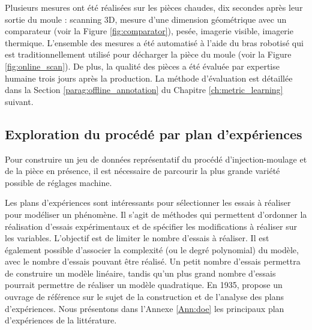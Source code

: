 Plusieurs mesures ont été réalisées sur les pièces chaudes, dix secondes après leur sortie du moule : scanning 3D, mesure d'une dimension géométrique avec un comparateur (voir la Figure \ref{fig:comparator}), pesée, imagerie visible, imagerie thermique.
L'ensemble des mesures a été automatisé à l'aide du bras robotisé qui est traditionnellement utilisé pour décharger la pièce du moule (voir la Figure \ref{fig:online_scan}).
De plus, la qualité des pièces a été évaluée par expertise humaine trois jours après la production.
La méthode d'évaluation est détaillée dans la Section \ref{parag:offline_annotation} du Chapitre \ref{ch:metric_learning} suivant.

\subsection{Exploration du procédé par plan d'expériences} \label{subsec:doe}
Pour construire un jeu de données représentatif du procédé d'injection-moulage et de la pièce en présence, il est nécessaire de parcourir la plus grande variété possible de réglages machine.

Les plans d'expériences sont intéressants pour sélectionner les essais à réaliser pour modéliser un phénomène.
Il s'agit de méthodes qui permettent d'ordonner la réalisation d'essais expérimentaux et de spécifier les modifications à réaliser sur les variables.
L'objectif est de limiter le nombre d'essais à réaliser.
Il est également possible d'associer la complexité (ou le degré polynomial) du modèle, avec le nombre d'essais pouvant être réalisé.
Un petit nombre d'essais permettra de construire un modèle linéaire, tandis qu'un plus grand nombre d'essais pourrait permettre de réaliser un modèle quadratique.
En 1935, \citeauthor{fisher_design_1974} \cite{fisher_design_1974} propose un ouvrage de référence sur le sujet de la construction et de l'analyse des plans d'expériences.
Nous présentons dans l'Annexe \ref{Ann:doe} les principaux plan d'expériences de la littérature.

